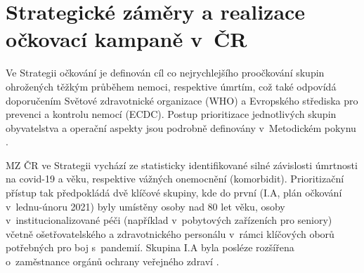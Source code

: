 




\section*{Strategické záměry a realizace očkovací kampaně v~ČR}
\label{sec:strategie}

Ve Strategii očkování \cite{strategie_covid} je definován cíl co nejrychlejšího proočkování skupin ohrožených těžkým průběhem nemoci, respektive úmrtím, což také odpovídá doporučením Světové zdravotnické organizace (WHO) a Evropského střediska pro prevenci a kontrolu nemocí (ECDC). Postup prioritizace jednotlivých skupin obyvatelstva a operační aspekty jsou podrobně definovány v~Metodickém pokynu \cite{ockovani_mp}. %
%

MZ ČR ve Strategii vychází ze statisticky identifikované silné závislosti úmrtnosti na covid-19 a věku, respektive vážných onemocnění (komorbidit). Prioritizační přístup tak předpokládá dvě klíčové skupiny, kde do první (I.A, plán očkování v~lednu-únoru 2021) byly umístěny osoby nad 80 let věku, osoby v~institucionalizované péči (například v~pobytových zařízeních pro seniory) včetně ošetřovatelského a zdravotnického personálu v~rámci klíčových oborů potřebných pro boj s~pandemií. Skupina I.A byla posléze rozšířena o~zaměstnance orgánů ochrany veřejného zdraví \cite{prioritizace_hygiena}. 

